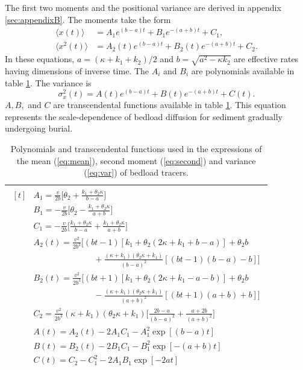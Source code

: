 \documentclass[]{agujournal2018}
\newcommand\be{\begin{equation}}
\newcommand\ee{\end{equation}}
\newcommand\bra{\langle}
\newcommand\ket{\rangle}
\begin{document}
 The first two moments and the positional variance are derived in appendix \ref{sec:appendixB}.
The moments take the form
\begin{align}
\bra x(t) \ket &= A_1 e^{(b-a)t}+B_1e^{-(a+b)t}+C_1, \label{eq:mean}\\
\bra x^2(t) \ket &= A_2(t)e^{(b-a)t}+B_2(t)e^{-(a+b)t}+C_2. \label{eq:second}
\end{align}
In these equations, $a = (\kappa + k_1+k_2)/2$ and $b = \sqrt{a^2-\kappa k_2}$ are effective rates having dimensions of inverse time.
The $A_i$ and $B_i$ are polynomials available in table \ref{table:params}.
The variance is
\be \sigma_x^2(t) = A(t)e^{(b-a)t} + B(t)e^{-(a+b)t} + C(t). \label{eq:var}\ee
$A, B,$ and $C$ are transcendental functions available in table \ref{table:params}.
This equation represents the scale-dependence of bedload diffusion for sediment gradually undergoing burial.
\begin{table}[!h]
	\centering
	\caption{Polynomials and transcendental functions used in the expressions of the mean (\ref{eq:mean}), second moment (\ref{eq:second}) and variance (\ref{eq:var}) of bedload tracers.}
	\label{table:params}
	\begin{tabular}{c}
		\toprule
		$\begin{aligned}[t]
		&A_1 = \frac{v}{2b}\big[\theta_2+\frac{k_1+\theta_2\kappa}{b-a}\big] \\
		&B_1 = -\frac{v}{2b}\big[\theta_2-\frac{k_1+\theta_2 \kappa}{a+b}\big] \\
		&C_1 =  -\frac{v}{2b}\big[\frac{k_1+\theta_2 \kappa}{b-a}+\frac{k_1+\theta_2 \kappa}{a+b}\big]\\
		&A_2(t) = \frac{v^2}{2b^3}\Big[(bt-1)[k_1+\theta_2(2\kappa + k_1 + b-a)]+\theta_2b \\
		&\hspace{3cm} + \frac{(\kappa+k_1)(\theta_2\kappa+k_1)}{(b-a)^2}[(bt-1)(b-a)-b]\Big]\\
		&B_2(t) = \frac{v^2}{2b^3}\Big[(bt+1)[k_1 + \theta_2(2\kappa+k_1-a-b)]+\theta_2b\\
		&\hspace{3cm} -\frac{(\kappa+k_1)(\theta_2\kappa+k_1)}{(a+b)^2}[(bt+1)(a+b)+b]\Big]\\
		&C_2 = \frac{v^2}{2b^3}(\kappa+k_1)(\theta_2 \kappa + k_1)\Big[\frac{2b-a}{(b-a)^2}+\frac{a+2b}{(a+b)^2}\Big]\\
		&A(t) = A_2(t)-2A_1C_1 - A_1^2\exp[(b-a)t]\\
		&B(t) = B_2(t)-2B_1C_1 - B_1^2\exp[-(a+b)t]\\
		&C(t) = C_2-C_1^2-2A_1B_1\exp[-2at]\\			
		\end{aligned}$\\
		\bottomrule
	\end{tabular}
\end{table}
\end{document}
